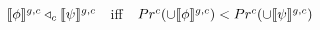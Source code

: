 $\intension[g,c]{$\phi$}\lprob_c\intension[g,c]{$\psi$}$~~iff~~$Pr^c(\cup\intension[g,c]{$\phi$})< Pr^c(\cup\intension[g,c]{$\psi$})$